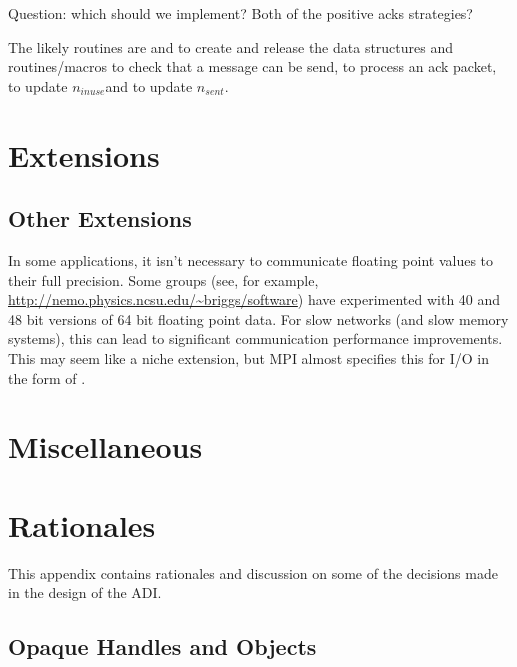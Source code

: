 \documentclass{article}
\let\findex=\index
\begin{document}
Question: which should we implement?  Both of the positive acks
strategies? 

The likely routines are
 and  to create and
release the data structures and routines/macros 
to check that a message can be send,  to process
an ack packet,  to update 
\makeussubscript$n_{inuse}$\makeustext and
 to update \makeussubscript$n_{sent}$\makeustext.

\section{Extensions}


\subsection{Other Extensions}
In some applications, it isn't necessary to communicate floating point values
to their full precision.  Some groups (see, for example,
\url{http://nemo.physics.ncsu.edu/~briggs/software}) have experimented with 40
and 48 bit versions of 64 bit floating point data.  For slow networks (and
slow memory systems), this can lead to significant communication performance
improvements.  This may seem like a niche extension, but MPI almost specifies
this for I/O in the form of
\findex{MPI_Register_datarep}.   

\openin{}
\ifeof\testfile\else
\section{Miscellaneous}

\fi
\closein\testfile

\appendix
\section{Rationales}
\label{sec:rationales}
This appendix contains rationales and discussion on some of the
decisions made in the design of the ADI.

\subsection{Opaque Handles and Objects}
\end{document}
